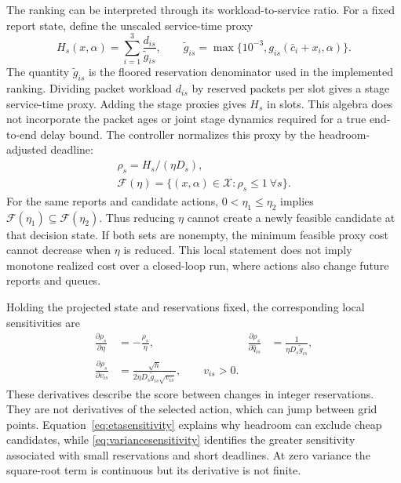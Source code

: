 \documentclass{IEEEoj}
\begin{document}
The ranking can be interpreted through its workload-to-service ratio.
For a fixed report state, define the unscaled service-time proxy
\begin{equation}
 H_s(x,\alpha)=\sum_{i=1}^{3}\frac{d_{is}}{\widetilde g_{is}},
 \qquad \widetilde g_{is}=\max\{10^{-3},g_{is}(\bar c_i+x_i,\alpha)\}.
 \label{eq:worktime}
\end{equation}
The quantity $\widetilde g_{is}$ is the floored reservation denominator used
in the implemented ranking. Dividing packet workload $d_{is}$ by reserved
packets per slot gives a stage service-time proxy. Adding the stage proxies
gives $H_s$ in slots. This algebra does not incorporate the packet ages or
joint stage dynamics required for a true end-to-end delay bound. The controller
normalizes this proxy by the headroom-adjusted deadline:
\begin{equation}
\begin{gathered}
 \rho_s=H_s/(\eta D_s),\\
 \mathcal F(\eta)=\{(x,\alpha)\in\mathcal X:\rho_s\le1\ \forall s\}.
\end{gathered}
\label{eq:feasibleset}
\end{equation}
For the same reports and candidate actions, $0<\eta_1\le\eta_2$ implies
$\mathcal F(\eta_1)\subseteq\mathcal F(\eta_2)$. Thus reducing $\eta$ cannot
create a newly feasible candidate at that decision state. If both sets are
nonempty, the minimum feasible proxy cost cannot decrease when $\eta$ is
reduced. This local statement does not imply monotone realized cost over a
closed-loop run, where actions also change future reports and queues.

Holding the projected state and reservations fixed, the corresponding local
sensitivities are
\begin{align}
 \frac{\partial\rho_s}{\partial\eta}&=-\frac{\rho_s}{\eta},&
 \frac{\partial\rho_s}{\partial\widehat q_{is}}&=\frac{1}{\eta D_s\widetilde g_{is}},
 \label{eq:etasensitivity}\\
 \frac{\partial\rho_s}{\partial v_{is}}&=
 \frac{\sqrt h}{2\eta D_s\widetilde g_{is}\sqrt{v_{is}}},\qquad v_{is}>0.
 \label{eq:variancesensitivity}
\end{align}
These derivatives describe the score between changes in integer reservations.
They are not derivatives of the selected action, which can jump between grid
points. Equation~\eqref{eq:etasensitivity} explains why headroom can exclude
cheap candidates, while \eqref{eq:variancesensitivity} identifies the greater
sensitivity associated with small reservations and short deadlines. At zero
variance the square-root term is continuous but its derivative is not finite.
\end{document}
